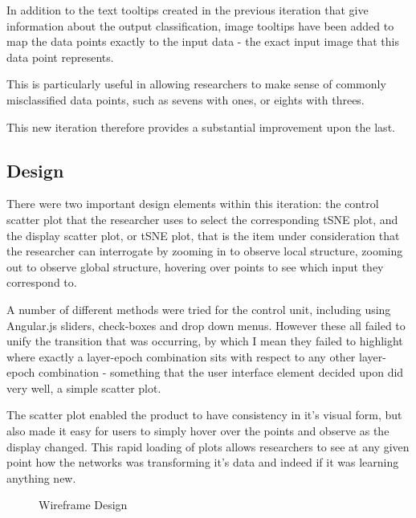 \documentclass[a4paper,11pt,titlepage]{article}
\begin{document}
	In addition to the text tooltips created in the previous iteration that give information about the output classification, image tooltips have been added to map the data points exactly to the input data - the exact input image that this data point represents. 
	\par 
	This is particularly useful in allowing researchers to make sense of commonly misclassified data points, such as sevens with ones, or eights with threes.
	\par 
	This new iteration therefore provides a substantial improvement upon the last.
	
	\subsection{Design}	
	There were two important design elements within this iteration: the control scatter plot that the researcher uses to select the corresponding tSNE plot, and the display scatter plot, or tSNE plot, that is the item under consideration that the researcher can interrogate by zooming in to observe local structure, zooming out to observe global structure, hovering over points to see which input they correspond to.
	\par 
	A number of different methods were tried for the control unit, including using Angular.js sliders, check-boxes and drop down menus. However these all failed to unify the transition that was occurring, by which I mean they failed to highlight where exactly a layer-epoch combination sits with respect to any other layer-epoch combination - something that the user interface element decided upon did very well, a simple scatter plot.
	\par 
	The scatter plot enabled the product to have consistency in it's visual form, but also made it easy for users to simply hover over the points and observe as the display changed. This rapid loading of plots allows researchers to see at any given point how the networks was transforming it's data and indeed if it was learning anything new.

	\begin{figure}[H]
    			\caption{Wireframe Design}%
	\end{figure}	
	 
\end{document}
